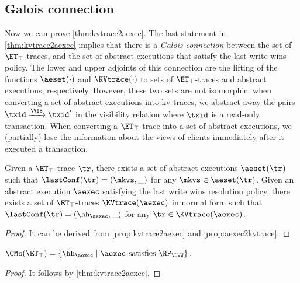 \subsection{Galois connection}
\label{sec:galois-kv-aexec}
Now we can prove \cref{thm:kvtrace2aexec}.
The last statement in \cref{thm:kvtrace2aexec} implies that there is a \emph{Galois connection}
between the set of $\ET_{\top}$-traces, and the set of abstract executions that satisfy the 
last write wins policy. The lower and upper adjoints of this connection are the 
lifting of the functions $\aeset(\cdot)$ and $\KVtrace(\cdot)$ to sets of $\ET_{\top}$-traces 
and abstract executions, respectively. However, these two sets are not isomorphic: 
when converting a set of abstract executions into kv-traces, we abstract away the 
pairs $\txid \xrightarrow{\VIS} \txid'$ in the visibility relation where $\txid$ is a read-only transaction.
When converting a $\ET_{\top}$-trace into a set of abstract executions, 
we (partially) lose the information about the views of clients immediately after it executed a transaction.

\begin{theorem}
\label{thm:kvtrace2aexec}
Given a $\ET_{\top}$-trace $\tr$, there exists a set of abstract executions $\aeset({\tr})$ 
such that $\lastConf(\tr) = (\mkvs, \_)$ for any $\mkvs \in \aeset(\tr)$.
Given an abstract execution $\aexec$ satisfying the last write wins resolution policy,
there exists a set of $\ET_{\top}$-traces $\KVtrace({\aexec})$ in normal form
such that $\lastConf(\tr) = (\hh_{\aexec}, \_)$ for any $\tr \in \KVtrace({\aexec})$.
\end{theorem}
\begin{proof}
    It can be derived from \cref{prop:kvtrace2aexec} and \cref{prop:aexec2kvtrace}.
\end{proof}

\begin{corollary} 
\label{cor:kvtrace2aexec}
$\CMs(\ET_{\top}) = \{\hh_{\aexec} \mid \aexec \text{ satisfies } \RP_{\LWW}\}$.
\end{corollary}
\begin{proof}
    It follows by \cref{thm:kvtrace2aexec}.
\end{proof}

